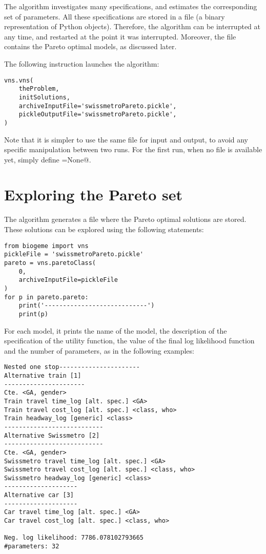 \documentclass[12pt,a4paper]{article}
\begin{document}
The algorithm investigates many specifications, and estimates the
corresponding set of parameters. All these specifications are stored
in a \lstinline@pickle@ file (a binary representation of Python
objects).  Therefore, the algorithm can be interrupted at any time,
and restarted at the point it was interrupted. Moreover, the
\lstinline@pickle@ file contains the Pareto optimal models, as
discussed later.

The following instruction launches the algorithm:
\begin{lstlisting}
vns.vns(
    theProblem,
    initSolutions,
    archiveInputFile='swissmetroPareto.pickle',
    pickleOutputFile='swissmetroPareto.pickle',
)
\end{lstlisting}
Note that it is simpler to use the same \lstinline@pickle@ file for
input and output, to avoid any specific manipulation between two
runs. For the first run, when no \lstinline@pickle@ file is available
yet, simply define \lstinline@archiveInputFile=None@.


\section{Exploring the Pareto set}

The algorithm generates a \lstinline@pickle@ file where the Pareto
optimal solutions are stored. These solutions can be explored using
the following statements: 
\begin{lstlisting}
from biogeme import vns
pickleFile = 'swissmetroPareto.pickle'
pareto = vns.paretoClass(
    0,
    archiveInputFile=pickleFile
)
for p in pareto.pareto:
    print('----------------------------')
    print(p)
\end{lstlisting}
For each model, it prints the name of the model, the description of
the specification of the utility function, the value of the final
log likelihood function and the number of parameters, as in the
following examples:
\begin{lstlisting}
Nested one stop----------------------
Alternative train [1]
----------------------
Cte. <GA, gender>
Train travel time_log [alt. spec.] <GA>
Train travel cost_log [alt. spec.] <class, who>
Train headway_log [generic] <class>
---------------------------
Alternative Swissmetro [2]
---------------------------
Cte. <GA, gender>
Swissmetro travel time_log [alt. spec.] <GA>
Swissmetro travel cost_log [alt. spec.] <class, who>
Swissmetro headway_log [generic] <class>
--------------------
Alternative car [3]
--------------------
Car travel time_log [alt. spec.] <GA>
Car travel cost_log [alt. spec.] <class, who>

Neg. log likelihood: 7786.078102793665
#parameters: 32
\end{lstlisting}
\end{document}
